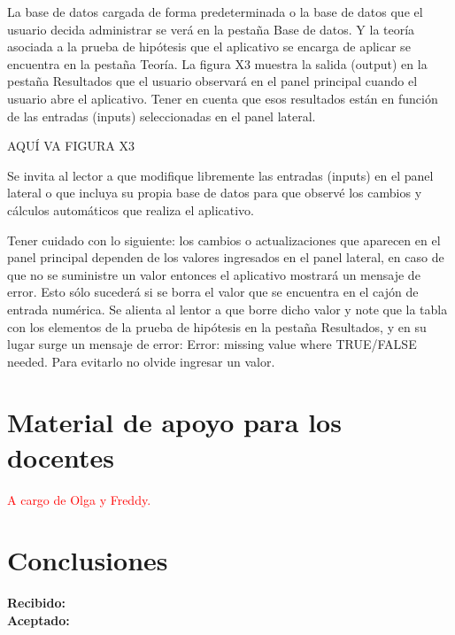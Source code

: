 \documentclass[]{comunicaciones}
\begin{document}
La base de datos cargada de forma predeterminada o la base de datos que el usuario decida administrar se verá en la pestaña Base de datos. Y la teoría asociada a la prueba de hipótesis que el aplicativo se encarga de aplicar se encuentra en la pestaña Teoría.
La figura X3 muestra la salida (output) en la pestaña Resultados que el usuario observará en el panel principal cuando el usuario abre el aplicativo. Tener en cuenta que esos resultados están en función de las entradas (inputs) seleccionadas en el panel lateral.

AQUÍ VA FIGURA X3

Se invita al lector a que modifique libremente las entradas (inputs) en el panel lateral o que incluya su propia base de datos para que observé los cambios y cálculos automáticos que realiza el aplicativo.

Tener cuidado con lo siguiente: los cambios o actualizaciones que aparecen en el panel principal dependen de los valores ingresados en el panel lateral, en caso de que no se suministre un valor entonces el aplicativo mostrará un mensaje de error. Esto sólo sucederá si se borra el valor que se encuentra en el cajón de entrada numérica. Se alienta al lentor a que borre dicho valor y note que la tabla con los elementos de la prueba de hipótesis en la pestaña Resultados, y en su lugar surge un mensaje de error: Error: missing value where TRUE/FALSE needed. Para evitarlo no olvide ingresar un valor.


\section{Material de apoyo para los docentes}

\textcolor{red}{A cargo de Olga y Freddy.}

\section{Conclusiones}

\begin{flushright}
\textbf{Recibido: }\\
\textbf{Aceptado: }
\end{flushright}

\nocite{*}
\end{document}
